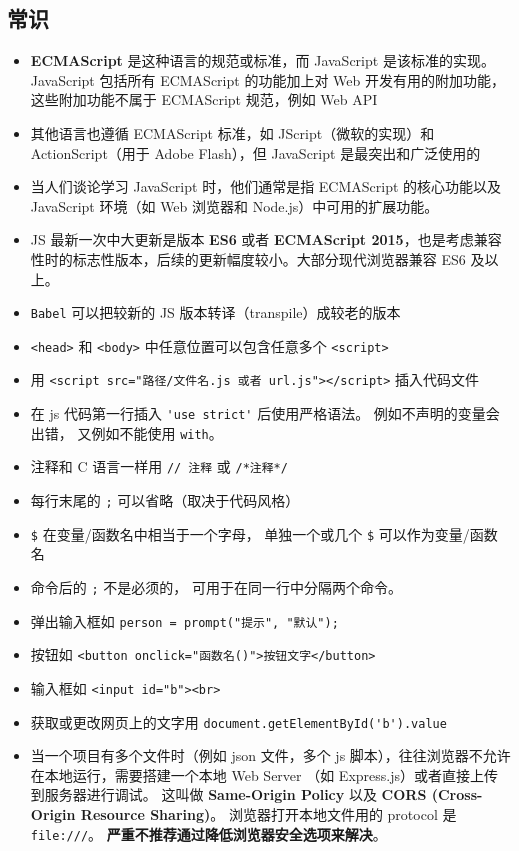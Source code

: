 \subsection{常识}
\begin{itemize}
\item \textbf{ECMAScript} 是这种语言的规范或标准，而 JavaScript 是该标准的实现。JavaScript 包括所有 ECMAScript 的功能加上对 Web 开发有用的附加功能，这些附加功能不属于 ECMAScript 规范，例如 Web API
\item 其他语言也遵循 ECMAScript 标准，如 JScript（微软的实现）和 ActionScript（用于 Adobe Flash），但 JavaScript 是最突出和广泛使用的
\item 当人们谈论学习 JavaScript 时，他们通常是指 ECMAScript 的核心功能以及 JavaScript 环境（如 Web 浏览器和 Node.js）中可用的扩展功能。
\item JS 最新一次中大更新是版本 \textbf{ES6} 或者 \textbf{ECMAScript 2015}，也是考虑兼容性时的标志性版本，后续的更新幅度较小。大部分现代浏览器兼容 ES6 及以上。
\item \verb`Babel` 可以把较新的 JS 版本转译（transpile）成较老的版本
\item \verb`<head>` 和 \verb`<body>` 中任意位置可以包含任意多个 \verb`<script>`
\item 用 \verb`<script src="路径/文件名.js 或者 url.js"></script>` 插入代码文件
\item 在 js 代码第一行插入 \verb`'use strict'` 后使用严格语法。 例如不声明的变量会出错， 又例如不能使用 \verb`with`。
\item 注释和 C 语言一样用 \verb`// 注释` 或 \verb`/*注释*/`
\item 每行末尾的 \verb`;` 可以省略（取决于代码风格）
\item \verb`$` 在变量/函数名中相当于一个字母， 单独一个或几个 \verb`$` 可以作为变量/函数名
\item 命令后的 \verb`;` 不是必须的， 可用于在同一行中分隔两个命令。
\item 弹出输入框如 \verb`person = prompt("提示", "默认");`
\item 按钮如 \verb`<button onclick="函数名()">按钮文字</button>`
\item 输入框如 \verb`<input id="b"><br>`
\item 获取或更改网页上的文字用 \verb`document.getElementById('b').value`
\item 当一个项目有多个文件时（例如 json 文件，多个 js 脚本），往往浏览器不允许在本地运行，需要搭建一个本地 Web Server （如 Express.js）或者直接上传到服务器进行调试。 这叫做 \textbf{Same-Origin Policy} 以及  \textbf{CORS (Cross-Origin Resource Sharing)}。 浏览器打开本地文件用的 protocol 是 \verb`file:///`。 \textbf{严重不推荐通过降低浏览器安全选项来解决}。
\end{itemize}


